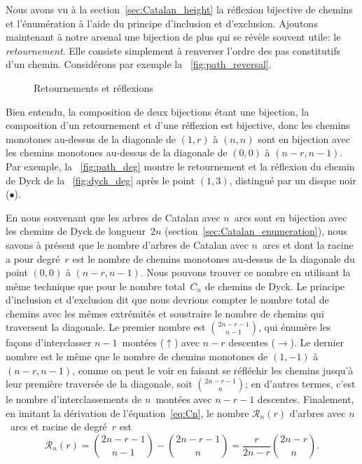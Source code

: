 Nous avons vu à la section~\vref{sec:Catalan_height} la réflexion
bijective de chemins et l'énumération à l'aide du principe d'inclusion
et d'exclusion. Ajoutons maintenant à notre arsenal une bijection de
plus qui se révèle souvent utile: le \emph{retournement}. Elle
consiste simplement à renverser l'ordre des pas constitutifs d'un
chemin. Considérons par exemple la \fig~\ref{fig:path_reversal}.
\begin{figure}
\centering
{}
\qquad
{}
\caption{Retournements et réflexions}
\end{figure}
Bien entendu, la composition de deux bijections étant une bijection,
la composition d'un retournement et d'une réflexion est bijective,
donc les chemins monotones au-dessus de la diagonale de \((1,r)\) à
\((n,n)\) sont en bijection avec les chemins monotones au-dessus de la
diagonale de \((0,0)\) à \((n-r,n-1)\). Par exemple, la
\fig~\ref{fig:path_deg} montre le retournement et la réflexion du
chemin de Dyck de la \fig~\ref{fig:dyck_deg} après le point \((1,3)\),
distingué par un disque noir (\(\bullet\)).

En nous souvenant que les arbres de Catalan avec \(n\)~arcs sont en
bijection avec les chemins de Dyck de longueur~\(2n\)
(section~\vref{sec:Catalan_enumeration}), nous savons à présent que le
nombre d'arbres de Catalan avec \(n\)~arcs et dont la racine a pour
degré~\(r\) est le nombre de chemins monotones au-dessus de la
diagonale du point \((0,0)\) à \((n-r,n-1)\). Nous pouvons trouver ce
nombre en utilisant la même technique que pour le nombre total~\(C_n\)
de chemins de Dyck. Le principe d'inclusion et d'exclusion dit que
nous devrions compter le nombre total de chemins avec les mêmes
extrémités et soustraire le nombre de chemins qui traversent la
diagonale. Le premier nombre est \(\binom{2n-r-1}{n-1}\), qui énumère
les façons d'interclasser \(n-1\)~montées (\(\uparrow\)) avec \(n-r\)
descentes (\(\rightarrow\)). Le dernier nombre est le même que le
nombre de chemins monotones de \((1,-1)\) à \((n-r,n-1)\), comme on
peut le voir en faisant se réfléchir les chemins jusqu'à leur première
traversée de la diagonale, soit \(\binom{2n-r-1}{n}\); en d'autres
termes, c'est le nombre d'interclassements de \(n\)~montées avec
\(n-r-1\) descentes. Finalement, en imitant la dérivation de
l'équation~\eqref{eq:Cn}, le nombre \(\mathcal{R}_n(r)\) d'arbres avec
\(n\)~arcs et racine de degré~\(r\) est
\begin{equation*}
\mathcal{R}_n(r) = \binom{2n-r-1}{n-1} - \binom{2n-r-1}{n}
                 = \frac{r}{2n-r} \binom{2n-r}{n}.
\end{equation*}


